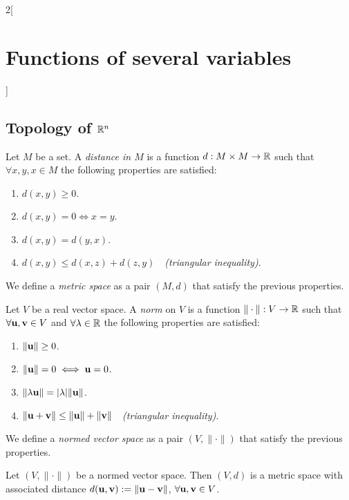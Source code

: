 \documentclass[../../../main.tex]{subfiles}
\begin{document}
\begin{multicols}{2}[\section{Functions of several variables}]
    \subsection{Topology of \texorpdfstring{$\mathbb{R}^n$}{Rn}}
    \begin{definition}
        Let $M$ be a set. A \textit{distance in $M$} is a function $d:M\times M\rightarrow\mathbb{R} $ such that $\forall x,y,x\in M$ the following properties are satisfied:
        \begin{enumerate}
            \item $d(x,y)\geq 0$.
            \item $d(x,y)=0\iff x=y$.
            \item $d(x,y)=d(y,x)$.
            \item $d(x,y)\leq d(x,z)+d(z,y)\quad$\textit{(triangular inequality)}.
        \end{enumerate}
        We define a \textit{metric space} as a pair $(M,d)$ that satisfy the previous properties.
        \label{FOSV_metric}
    \end{definition}
    \begin{definition}\label{FOSV_norm}
        Let $V$ be a real vector space. A \textit{norm} on $V$ is a function $\|\cdot\|:V\rightarrow\mathbb{R} $ such that $\forall \vb{u},\vb{v}\in V$ and $\forall\lambda\in\mathbb{R} $ the following properties are satisfied:
        \begin{enumerate}
            \item $\|\vb{u}\|\geq 0$.
            \item $\|\vb{u}\|=0\iff \vb{u}=0$.
            \item $\|\lambda \vb{u}\|=|\lambda|\|\vb{u}\|$.
            \item $\|\vb{u}+\vb{v}\|\leq \|\vb{u}\|+\|\vb{v}\|\quad$\textit{(triangular inequality)}.
        \end{enumerate}
        We define a \textit{normed vector space} as a pair $(V,\|\cdot\|)$ that satisfy the previous properties.
    \end{definition}
    \begin{prop}
        Let $(V,\|\cdot\|)$ be a normed vector space. Then $(V,d)$ is a metric space with associated distance $d(\vb{u},\vb{v}):=\|\vb{u}-\vb{v}\|$, $\forall \vb{u},\vb{v}\in V$.

\end{prop}
\end{multicols}
\end{document}
